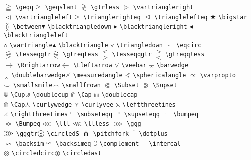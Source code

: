 \documentclass{asl}
\begin{document}
\begin{tabbing}
$\geqq$ \>\verb+\geqq+\>$\geqslant$ \>\verb+\geqslant+\>
$\gtrless$ \>\verb+\gtrless+\>
$\vartriangleright$ \>\verb+\vartriangleright+\\
$\vartriangleleft$ \>\verb+\vartriangleleft+\>$\trianglerighteq$ \>\verb+\trianglerighteq+\>
$\trianglelefteq$ \>\verb+\trianglelefteq+\>
$\bigstar$ \>\verb+\bigstar+\\
$\between$ \>\verb+\between+\>$\blacktriangledown$ \>\verb+\blacktriangledown+\>
$\blacktriangleright$ \>\verb+\blacktriangleright+\>
$\blacktriangleleft$ \>\verb+\blacktriangleleft+\\
$\vartriangle$ \>\verb+\vartriangle+\>$\blacktriangle$ \>\verb+\blacktriangle+\>
$\triangledown$ \>\verb+\triangledown+\>
$\eqcirc$ \>\verb+\eqcirc+\\
$\lesseqgtr$ \>\verb+\lesseqgtr+\>$\gtreqless$ \>\verb+\gtreqless+\>
$\lesseqqgtr$ \>\verb+\lesseqqgtr+\>
$\gtreqqless$ \>\verb+\gtreqqless+\\
$\Rrightarrow$ \>\verb+\Rrightarrow+\>$\Lleftarrow$ \>\verb+\Lleftarrow+\>
$\veebar$ \>\verb+\veebar+\>
$\barwedge$ \>\verb+\barwedge+\\
$\doublebarwedge$ \>\verb+\doublebarwedge+\>$\measuredangle$ \>\verb+\measuredangle+\>
$\sphericalangle$ \>\verb+\sphericalangle+\>
$\varpropto$ \>\verb+\varpropto+\\
$\smallsmile$ \>\verb+\smallsmile+\>$\smallfrown$ \>\verb+\smallfrown+\>
$\Subset$ \>\verb+\Subset+\>
$\Supset$ \>\verb+\Supset+\\
$\Cup$ \>\verb+\Cup+\>$\doublecup$ \>\verb+\doublecup+\>
$\Cap$ \>\verb+\Cap+\>
$\doublecap$ \>\verb+\doublecap+\\
$\Cap$ \>\verb+\Cap+\>$\curlywedge$ \>\verb+\curlywedge+\>
$\curlyvee$ \>\verb+\curlyvee+\>
$\leftthreetimes$ \>\verb+\leftthreetimes+\\
$\rightthreetimes$ \>\verb+\rightthreetimes+\>$\subseteqq$ \>\verb+\subseteqq+\>
$\supseteqq$ \>\verb+\supseteqq+\>
$\bumpeq$ \>\verb+\bumpeq+\\
$\Bumpeq$ \>\verb+\Bumpeq+\>$\lll$ \>\verb+\lll+\>
$\llless$ \>\verb+\llless+\>
$\ggg$ \>\verb+\ggg+\\
$\gggtr$ \>\verb+\gggtr+\>$\circledS$ \>\verb+\circledS+\>
$\pitchfork$ \>\verb+\pitchfork+\>
$\dotplus$ \>\verb+\dotplus+\\
$\backsim$ \>\verb+\backsim+\>$\backsimeq$ \>\verb+\backsimeq+\>
$\complement$ \>\verb+\complement+\>
$\intercal$ \>\verb+\intercal+\\
$\circledcirc$ \>\verb+\circledcirc+\>$\circledast$ \>\verb+\circledast+\>

\end{tabbing}
\end{document}
